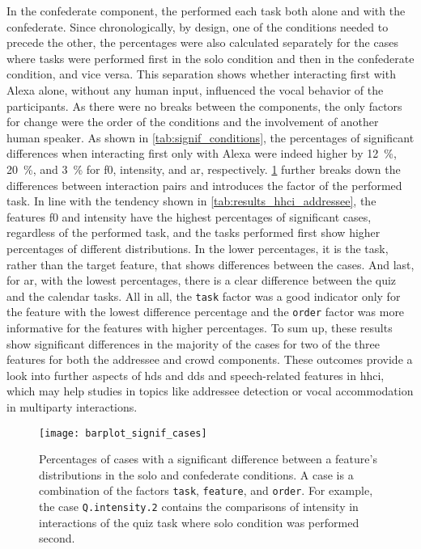 %
In the confederate component, the performed each task both alone and with the confederate.
Since chronologically, by design, one of the conditions needed to precede the other, the percentages were also calculated separately for the cases where tasks were performed first in the solo condition and then in the confederate condition, and vice versa.
This separation shows whether interacting first with Alexa alone, without any human input, influenced the vocal behavior of the participants.
As there were no breaks between the components, the only factors for change were the order of the conditions and the involvement of another human speaker.
As shown in \cref{tab:signif_conditions}, the percentages of significant differences when interacting first only with Alexa were indeed higher by \SI{12}{\percent}, \SI{20}{\percent}, and \SI{3}{\percent} for \ac{f0}, intensity, and \ac{ar}, respectively.
\cref{fig:signif_cases_ordered} further breaks down the differences between interaction pairs and introduces the factor of the performed task.
In line with the tendency shown in \cref{tab:results_hhci_addressee}, the features \ac{f0} and intensity have the highest percentages of significant cases, regardless of the performed task, and the tasks performed first show higher percentages of different distributions.
In the lower percentages, it is the task, rather than the target feature, that shows differences between the cases.
And last, for \ac{ar}, with the lowest percentages, there is a clear difference between the quiz and the calendar tasks.
All in all, the \texttt{task} factor was a good indicator only for the feature with the lowest difference percentage and the \texttt{order} factor was more informative for the features with higher percentages.
To sum up, these results show significant differences in the majority of the cases for two of the three features for both the addressee and crowd components.
These outcomes provide a look into further aspects of \ac{hds} and \ac{dds} and speech-related features in \ac{hhci}, which may help studies in topics like addressee detection or vocal accommodation in  multiparty interactions.
%
%
\begin{figure}[t]
	\centering
	\texttt{[image: barplot\_signif\_cases]}
	\caption[Per-case comparison of significant distributional differences in the crowd component]
		{Percentages of cases with a significant difference between a feature's distributions in the solo and confederate conditions.
		A case is a combination of the factors \texttt{task}, \texttt{feature}, and \texttt{order}.
		For example, the case \texttt{Q.intensity.2} contains the comparisons of intensity in interactions of the quiz task where solo condition was performed second.}
	\label{fig:signif_cases_ordered}
\end{figure}

